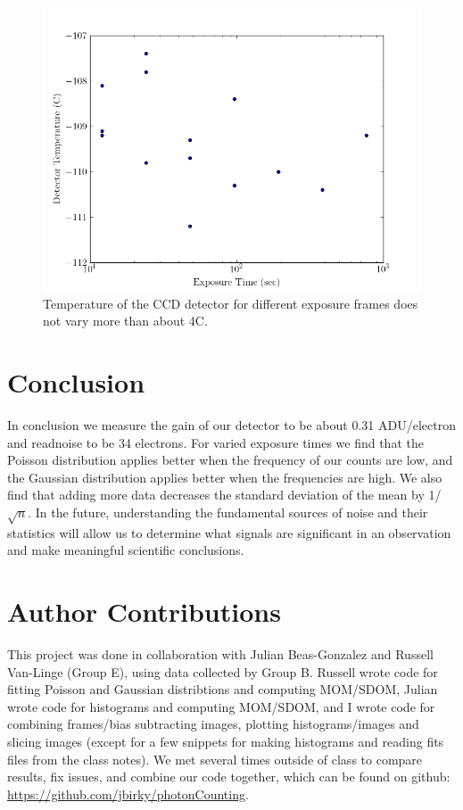 \documentclass[preprint]{aastex62}
\begin{document}
\begin{figure}[H]
\begin{center}
\includegraphics[width=.48\linewidth]{plots/exposure_temp.png}
\caption{Temperature of the CCD detector for different exposure frames does not vary more than about 4C.} \label{fig:temp}
\end{center}
\end{figure}

\section{Conclusion}
In conclusion we measure the gain of our detector to be about 0.31 ADU/electron and readnoise to be 34 electrons. For varied exposure times we find that the Poisson distribution applies better when the frequency of our counts are low, and the Gaussian distribution applies better when the frequencies are high. We also find that adding more data decreases the standard deviation of the mean by 1/$\sqrt{n}$. In the future, understanding the fundamental sources of noise and their statistics will allow us to determine what signals are significant in an observation and make meaningful scientific conclusions.

\section{Author Contributions}

This project was done in collaboration with Julian Beas-Gonzalez and Russell Van-Linge (Group E), using data collected by Group B. Russell wrote code for fitting Poisson and Gaussian distribtions and computing MOM/SDOM, Julian wrote code for histograms and computing MOM/SDOM, and I wrote code for combining frames/bias subtracting images, plotting histograms/images and slicing images (except for a few snippets for making histograms and reading fits files from the class notes). We met several times outside of class to compare results, fix issues, and combine our code together, which can be found on github: \href{https://github.com/jbirky/photonCounting}{https://github.com/jbirky/photonCounting}.
\end{document}
